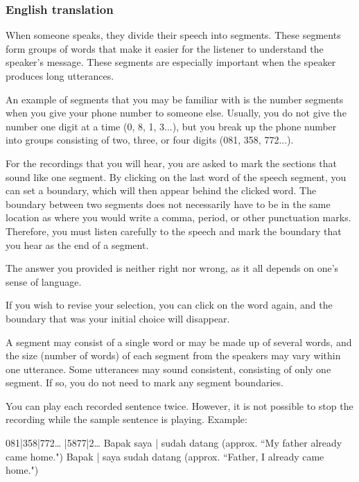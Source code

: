 \subsubsection{English translation}
\label{Instructions_b_ENG}




When someone speaks, they divide their speech into segments. These segments form groups of words that make it easier for the listener to understand the speaker's message. These segments are especially important when the speaker produces long utterances. \newline 


An example of segments that you may be familiar with is the number segments when you give your phone number to someone else. Usually, you do not give the number one digit at a time (0, 8, 1, 3...), but you break up the phone number into groups consisting of two, three, or four digits (081, 358, 772...).
\newline 

For the recordings that you will hear, you are asked to mark the sections that sound like one segment. By clicking on the last word of the speech segment, you can set a boundary, which will then appear behind the clicked word. The boundary between two segments does not necessarily have to be in the same location as where you would write a comma, period, or other punctuation marks. Therefore, you must listen carefully to the speech and mark the boundary that you hear as the end of a segment.
\newline 

The answer you provided is neither right nor wrong, as it all depends on one's sense of language.
\newline 

If you wish to revise your selection, you can click on the word again, and the boundary that was your initial choice will disappear.\newline 


A segment may consist of a single word or may be made up of several words, and the size (number of words) of each segment from the speakers may vary within one utterance. Some utterances may sound consistent, consisting of only one segment. If so, you do not need to mark any segment boundaries.\newline

You can play each recorded sentence twice. However, it is not possible to stop the recording while the sample sentence is playing.\newline 
Example:  
\begin{center}
	
	081|358|772… |5877|2… \newline
	Bapak saya | sudah datang (approx. ``My father already came home.") \newline
	Bapak | saya sudah datang (approx. ``Father, I already came home.")\newline
\end{center}


